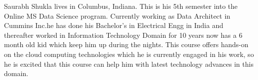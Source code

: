 Saurabh Shukla lives in Columbus, Indiana. This is his 5th semester into the Online MS Data Science program.
Currently working as Data Architect in Cummins Inc.he has done his Bachelor's in Electrical Engg in India and 
thereafter worked in Information Technology Domain for 10 years now has a 6 month old kid which keep him up during the nights.
This course offers hands-on on the cloud computing technologies which he is currently engaged in his work,
so he is excited that this course can help him with latest technology advances in this domain.
